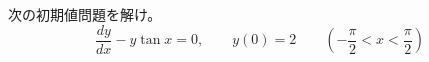 
次の初期値問題を解け。
\[
\frac{dy}{dx} - y\tan x = 0, \qquad y(0) = 2 \qquad \left(-\frac{\pi}{2} < x < \frac{\pi}{2}\right)
\]
